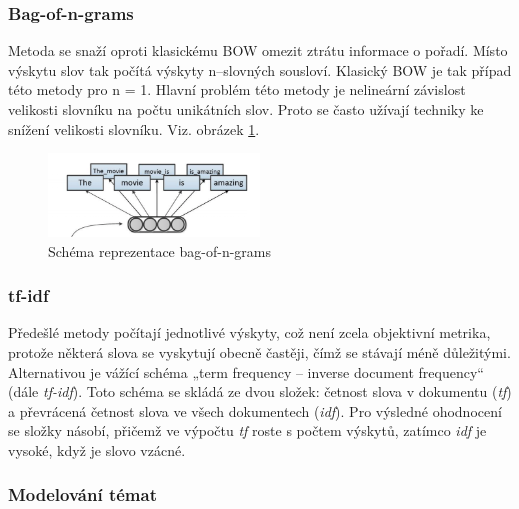 \documentclass[thesis=M,czech]{FITthesis}[2019/12/23]
\begin{document}
\subsubsection*{Bag-of-n-grams}
Metoda se snaží oproti klasickému BOW omezit ztrátu informace o pořadí. Místo výskytu slov tak počítá výskyty n--slovných sousloví. Klasický BOW je tak případ této metody pro n = 1. Hlavní problém této metody je nelineární závislost velikosti slovníku na počtu unikátních slov. Proto se často užívají techniky ke snížení velikosti slovníku. Viz. obrázek \ref{fig:palachy2019BONG}.
\begin{figure}\centering
	\includegraphics[width=0.5\textwidth]{images/palachy2019/palachy2019_BONG.png}
	\caption{Schéma reprezentace bag-of-n-grams\cite{palachy2019}}\label{fig:palachy2019BONG}
\end{figure}

\subsubsection*{tf-idf}
Předešlé metody počítají jednotlivé výskyty, což není zcela objektivní metrika, protože některá slova se vyskytují obecně častěji, čímž se stávají méně důležitými. Alternativou je vážící schéma „term frequency – inverse document frequency“ (dále \textit{tf-idf}). Toto schéma se skládá ze dvou složek: četnost slova v dokumentu (\textit{tf}) a převrácená četnost slova ve všech dokumentech (\textit{idf}). Pro výsledné ohodnocení se složky násobí, přičemž ve výpočtu \textit{tf} roste s počtem výskytů, zatímco \textit{idf} je vysoké, když je slovo vzácné.

\subsubsection{Modelování témat}
\end{document}
